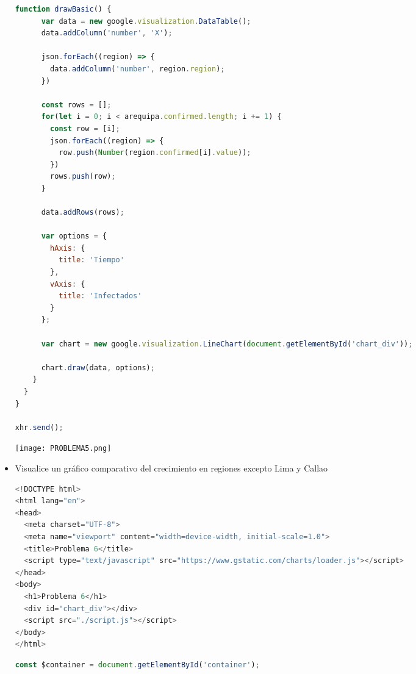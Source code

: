\documentclass{article}
\begin{document}
\begin{itemize}
\begin{lstlisting}[language=JavaScript, caption=PROBLEMA5-SCRIPT]
    function drawBasic() {
      var data = new google.visualization.DataTable();
      data.addColumn('number', 'X');

      json.forEach((region) => {
        data.addColumn('number', region.region);
      })

      const rows = [];
      for(let i = 0; i < arequipa.confirmed.length; i += 1) {
        const row = [i];
        json.forEach((region) => {
          row.push(Number(region.confirmed[i].value));
        })
        rows.push(row);
      }

      data.addRows(rows);

      var options = {
        hAxis: {
          title: 'Tiempo'
        },
        vAxis: {
          title: 'Infectados'
        }
      };

      var chart = new google.visualization.LineChart(document.getElementById('chart_div'));

      chart.draw(data, options);
    }
  }
}

xhr.send();
            \end{lstlisting}  

            \newline \newline \newline
            \texttt{[image: PROBLEMA5.png]}
            \newline \newline \newline

            \item Visualice un gráfico comparativo del crecimiento en regiones excepto Lima y Callao
            
            \begin{lstlisting}[language=JavaScript, caption=PROBLEMA6-INDEX]
<!DOCTYPE html>
<html lang="en">
<head>
  <meta charset="UTF-8">
  <meta name="viewport" content="width=device-width, initial-scale=1.0">
  <title>Problema 6</title>
  <script type="text/javascript" src="https://www.gstatic.com/charts/loader.js"></script>
</head>
<body>
  <h1>Problema 6</h1>
  <div id="chart_div"></div>
  <script src="./script.js"></script>
</body>
</html>
            \end{lstlisting}  

            \begin{lstlisting}[language=JavaScript, caption=PROBLEMA6-SCRIPT]
const $container = document.getElementById('container');


\end{lstlisting}
\end{itemize}
\end{document}
